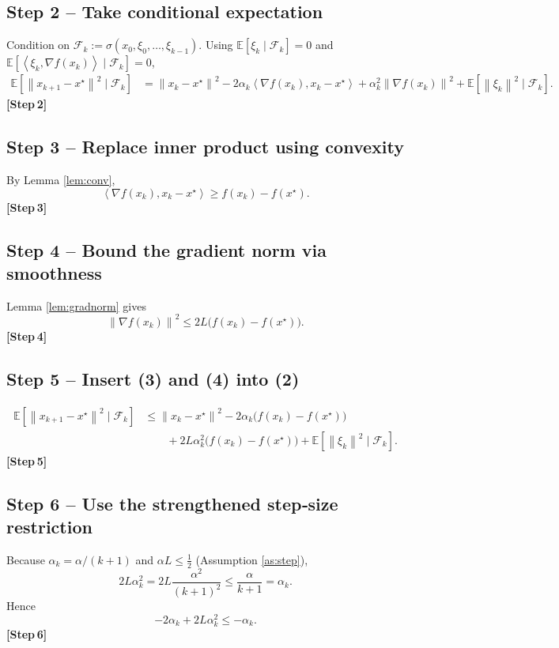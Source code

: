 \documentclass{article}
\newcommand{\E}{\mathbb{E}}
\newcommand{\norm}[1]{\left\lVert #1\right\rVert}
\newcommand{\ip}[2]{\left\langle #1,#2\right\rangle}
\begin{document}
\subsection*{Step 2 – Take conditional expectation}
Condition on $\mathcal F_k:=\sigma(x_0,\xi_0,\dots,\xi_{k-1})$.
Using $\E[\xi_k\mid\mathcal F_k]=0$ and $\E[\ip{\xi_k}{\nabla f(x_k)}\mid\mathcal F_k]=0$,
\[
\begin{aligned}
\E\!\left[\norm{x_{k+1}-x^\star}^{2}\mid\mathcal F_k\right]
&=\norm{x_k-x^\star}^{2}
-2\alpha_k\ip{\nabla f(x_k)}{x_k-x^\star}
+\alpha_k^{2}\norm{\nabla f(x_k)}^{2}
+\E\!\left[\norm{\xi_k}^{2}\mid\mathcal F_k\right].
\end{aligned}
\tag{2}
\]
\textbf{[Step 2]}

\subsection*{Step 3 – Replace inner product using convexity}
By Lemma \ref{lem:conv},
\[
\ip{\nabla f(x_k)}{x_k-x^\star}\ge f(x_k)-f(x^\star).
\tag{3}
\]
\textbf{[Step 3]}

\subsection*{Step 4 – Bound the gradient norm via smoothness}
Lemma \ref{lem:gradnorm} gives
\[
\norm{\nabla f(x_k)}^{2}\le 2L\bigl(f(x_k)-f(x^\star)\bigr).
\tag{4}
\]
\textbf{[Step 4]}

\subsection*{Step 5 – Insert (3) and (4) into (2)}
\[
\begin{aligned}
\E\!\left[\norm{x_{k+1}-x^\star}^{2}\mid\mathcal F_k\right]
&\le \norm{x_k-x^\star}^{2}
-2\alpha_k\bigl(f(x_k)-f(x^\star)\bigr)\\
&\qquad+2L\alpha_k^{2}\bigl(f(x_k)-f(x^\star)\bigr)
+\E\!\left[\norm{\xi_k}^{2}\mid\mathcal F_k\right].
\end{aligned}
\tag{5}
\]
\textbf{[Step 5]}

\subsection*{Step 6 – Use the strengthened step‑size restriction}
Because $\alpha_k=\alpha/(k+1)$ and $\alpha L\le\frac12$ (Assumption \ref{as:step}),
\[
2L\alpha_k^{2}=2L\frac{\alpha^{2}}{(k+1)^{2}}
\le \frac{\alpha}{k+1}= \alpha_k .
\tag{6}
\]
Hence
\[
-2\alpha_k+2L\alpha_k^{2}\le -\alpha_k .
\tag{6'}
\]
\textbf{[Step 6]}
\end{document}
